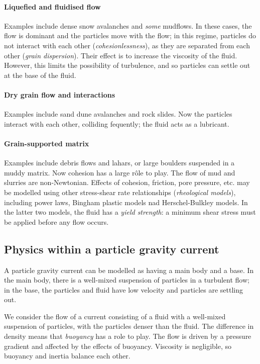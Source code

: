 \paragraph{Liquefied and fluidised flow} Examples include dense snow avalanches
and \textit{some} mudflows. In these cases, the flow is dominant and the
particles move with the flow; in this regime, particles do not interact with
each other (\textit{cohesionlessness}), as they are separated from each other
(\textit{grain dispersion}). Their effect is to increase the viscosity of the
fluid. However, this limits the possibility of turbulence, and so particles can 
settle out at the base of the fluid.

\paragraph{Dry grain flow and interactions} Examples include sand dune
avalanches and rock slides. Now the particles interact with each other,
colliding fequently; the fluid acts as a lubricant. 

\paragraph{Grain-supported matrix} Examples include debris flows and lahars, or
large boulders suspended in a muddy matrix. Now cohesion has a large r\^ole to
play. The flow of mud and slurries are non-Newtonian. Effects of cohesion,
friction, pore pressure, etc. may be modelled using other stress-shear rate
relationships (\textit{rheological models}), including power laws, Bingham
plastic models nad Herschel-Bulkley models. In the latter two models, the fluid
has a \textit{yield strength}: a minimum shear stress must be applied before any
flow occurs. 

\subsection{Physics within a particle gravity current}

A particle gravity current can be modelled as having a main body and a base. In the main body, there is a well-mixed suspension of particles in a turbulent flow; in the base, the particles and fluid have low velocity and particles are settling out. 

We consider the flow of a current consisting of a fluid with a well-mixed suspension of particles, with the particles denser than the fluid. The difference in density means that \textit{buoyancy} has a role to play. The flow is driven by a pressure gradient and affected by the effects of buoyancy. Viscosity is negligible, so buoyancy and inertia balance each other. 

